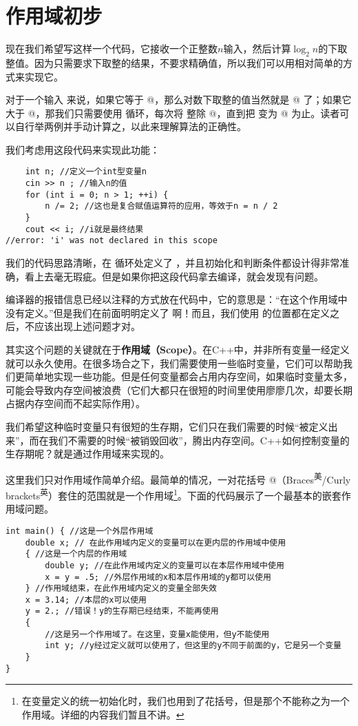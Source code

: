\section{作用域初步}
现在我们希望写这样一个代码，它接收一个正整数$n$输入，然后计算$\log_2n$的下取整值。因为只需要求下取整的结果，不要求精确值，所以我们可以用相对简单的方式来实现它。\par
对于一个输入 \lstinline@n@ 来说，如果它等于 @，那么对数下取整的值当然就是 @ 了；如果它大于 @，那我们只需要使用 \lstinline@for@ 循环，每次将 \lstinline@n@ 整除 @，直到把 \lstinline@n@ 变为 @ 为止。读者可以自行举两例并手动计算之，以此来理解算法的正确性。\par
我们考虑用这段代码来实现此功能：\pagebreak
\begin{lstlisting}
    int n; //定义一个int型变量n
    cin >> n ; //输入n的值
    for (int i = 0; n > 1; ++i) {
        n /= 2; //这也是复合赋值运算符的应用，等效于n = n / 2
    }
    cout << i; //i就是最终结果
//error: 'i' was not declared in this scope
\end{lstlisting}
我们的代码思路清晰，在 \lstinline@for@ 循环处定义了 \lstinline@i@，并且初始化和判断条件都设计得非常准确，看上去毫无瑕疵。但是如果你把这段代码拿去编译，就会发现有问题。\par
编译器的报错信息已经以注释的方式放在代码中，它的意思是：``\lstinline@i@ 在这个作用域中没有定义。''但是我们在前面明明定义了 \lstinline@i@ 啊！而且，我们使用 \lstinline@i@ 的位置都在定义之后，不应该出现上述问题才对。\par
其实这个问题的关键就在于\textbf{作用域（Scope）}。在C++中，并非所有变量一经定义就可以永久使用。在很多场合之下，我们需要使用一些临时变量，它们可以帮助我们更简单地实现一些功能。但是任何变量都会占用内存空间，如果临时变量太多，可能会导致内存空间被浪费（它们大都只在很短的时间里使用廖廖几次，却要长期占据内存空间而不起实际作用）。\par
我们希望这种临时变量只有很短的生存期，它们只在我们需要的时候``被定义出来''，而在我们不需要的时候``被销毁回收''，腾出内存空间。C++如何控制变量的生存期呢？就是通过作用域来实现的。\par
这里我们只对作用域作简单介绍。最简单的情况，一对花括号 \lstinline@{}@（Braces\textsuperscript{美}/Curly brackets\textsuperscript{英}）套住的范围就是一个作用域\footnote{在变量定义的统一初始化时，我们也用到了花括号，但是那个不能称之为一个作用域。详细的内容我们暂且不讲。}。下面的代码展示了一个最基本的嵌套作用域问题。
\begin{lstlisting}
int main() { //这是一个外层作用域
    double x; // 在此作用域内定义的变量可以在更内层的作用域中使用
    { //这是一个内层的作用域
        double y; //在此作用域内定义的变量可以在本层作用域中使用
        x = y = .5; //外层作用域的x和本层作用域的y都可以使用
    } //作用域结束，在此作用域内定义的变量全部失效
    x = 3.14; //本层的x可以使用
    y = 2.; //错误！y的生存期已经结束，不能再使用
    {
        //这是另一个作用域了。在这里，变量x能使用，但y不能使用
        int y; //y经过定义就可以使用了，但这里的y不同于前面的y，它是另一个变量
    }
}
\end{lstlisting}\par
